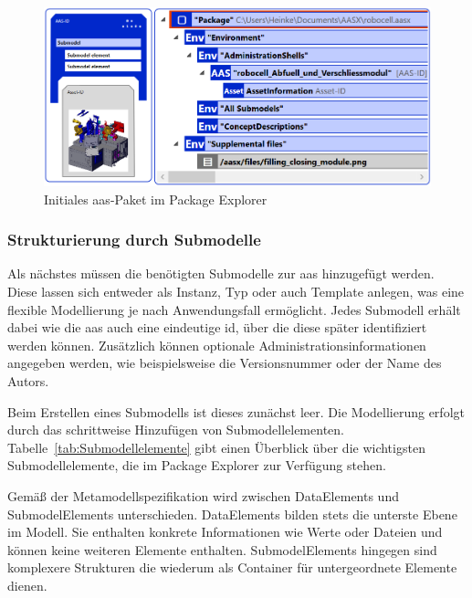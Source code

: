 \begin{figure}[htbp]
    \centering
    \includegraphics[width=\textwidth]{Bilder/ModellierungAAS/Final/AASPaketPackageExplorer.PNG}
    \caption[Initiales \acs{aas}-Paket im Package Explorer]{Initiales \acs{aas}-Paket im Package Explorer}
    \label{fig:NeuesAASPaket}
\end{figure}



\subsubsection*{Strukturierung durch Submodelle}
\vspace{-0.5em}

Als nächstes müssen die benötigten Submodelle zur \acs{aas} hinzugefügt werden.
Diese lassen sich entweder als Instanz, Typ oder auch Template anlegen, was eine flexible Modellierung je nach Anwendungsfall ermöglicht.
Jedes Submodell erhält dabei wie die \acs{aas} auch eine eindeutige \acs{id}, über die diese später identifiziert werden können.
Zusätzlich können optionale Administrationsinformationen angegeben werden, wie beispielsweise die Versionsnummer oder der Name des Autors.

Beim Erstellen eines Submodells ist dieses zunächst leer. 
Die Modellierung erfolgt durch das schrittweise Hinzufügen von Submodellelementen.
Tabelle~\ref{tab:Submodellelemente} gibt einen Überblick über die wichtigsten Submodellelemente, die im Package Explorer zur Verfügung stehen.


\vspace{-0.5em}

Gemäß der Metamodellspezifikation \cite{SpezifikationPart1} wird zwischen DataElements und SubmodelElements unterschieden.
DataElements bilden stets die unterste Ebene im Modell. Sie enthalten konkrete Informationen wie Werte oder Dateien und können keine weiteren Elemente enthalten.
SubmodelElements hingegen sind komplexere Strukturen die wiederum als Container für untergeordnete Elemente dienen.

